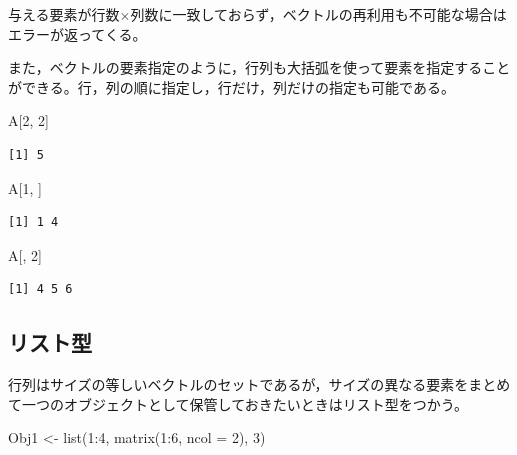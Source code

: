 \documentclass[
  a4paper,
]{ltjsbook}
\newenvironment{Shaded}{\begin{snugshade}}{\end{snugshade}}
\newcommand{\AttributeTok}[1]{\textcolor[rgb]{0.40,0.45,0.13}{#1}}
\newcommand{\DecValTok}[1]{\textcolor[rgb]{0.68,0.00,0.00}{#1}}
\newcommand{\FunctionTok}[1]{\textcolor[rgb]{0.28,0.35,0.67}{#1}}
\newcommand{\NormalTok}[1]{\textcolor[rgb]{0.00,0.23,0.31}{#1}}
\newcommand{\OtherTok}[1]{\textcolor[rgb]{0.00,0.23,0.31}{#1}}
\newcommand{\SpecialCharTok}[1]{\textcolor[rgb]{0.37,0.37,0.37}{#1}}
\begin{document}
与える要素が行数\(\times\)列数に一致しておらず，ベクトルの再利用も不可能な場合はエラーが返ってくる。

また，ベクトルの要素指定のように，行列も大括弧を使って要素を指定することができる。行，列の順に指定し，行だけ，列だけの指定も可能である。

\begin{Shaded}
\begin{Highlighting}[]
\NormalTok{A[}\DecValTok{2}\NormalTok{, }\DecValTok{2}\NormalTok{]}
\end{Highlighting}
\end{Shaded}

\begin{verbatim}
[1] 5
\end{verbatim}

\begin{Shaded}
\begin{Highlighting}[]
\NormalTok{A[}\DecValTok{1}\NormalTok{, ]}
\end{Highlighting}
\end{Shaded}

\begin{verbatim}
[1] 1 4
\end{verbatim}

\begin{Shaded}
\begin{Highlighting}[]
\NormalTok{A[, }\DecValTok{2}\NormalTok{]}
\end{Highlighting}
\end{Shaded}

\begin{verbatim}
[1] 4 5 6
\end{verbatim}

\subsection{リスト型}\label{ux30eaux30b9ux30c8ux578b}

行列はサイズの等しいベクトルのセットであるが，サイズの異なる要素をまとめて一つのオブジェクトとして保管しておきたいときはリスト型をつかう。

\begin{Shaded}
\begin{Highlighting}[]
\NormalTok{Obj1 }\OtherTok{\textless{}{-}} \FunctionTok{list}\NormalTok{(}\DecValTok{1}\SpecialCharTok{:}\DecValTok{4}\NormalTok{, }\FunctionTok{matrix}\NormalTok{(}\DecValTok{1}\SpecialCharTok{:}\DecValTok{6}\NormalTok{, }\AttributeTok{ncol =} \DecValTok{2}\NormalTok{), }\DecValTok{3}\NormalTok{)}
\end{Highlighting}
\end{Shaded}
\end{document}
